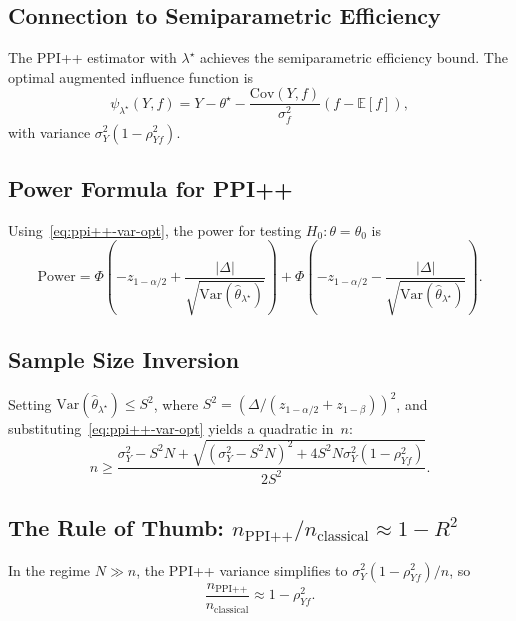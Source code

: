 \documentclass[11pt]{article}
\newcommand{\E}{\mathbb{E}}
\newcommand{\Var}{\mathrm{Var}}
\newcommand{\Cov}{\mathrm{Cov}}
\newcommand{\wh}{\widehat}
\begin{document}
\subsection{Connection to Semiparametric Efficiency}
\label{sec:eif}

The PPI++ estimator with $\lambda^\star$ achieves the semiparametric
efficiency bound.  The optimal augmented influence function is
\[
\psi_{\lambda^\star}(Y,f) = Y - \theta^\star -
  \frac{\Cov(Y,f)}{\sigma_f^2}(f - \E[f]),
\]
with variance $\sigma_Y^2(1 - \rho_{Yf}^2)$.

\subsection{Power Formula for PPI++}
\label{sec:ppi-power-formula}

Using~\eqref{eq:ppi++-var-opt}, the power for testing
$H_0:\theta=\theta_0$ is
\begin{equation}\label{eq:ppi++-power}
\text{Power} = \Phi\!\left(-z_{1-\alpha/2} +
  \frac{|\Delta|}{\sqrt{\Var(\wh\theta_{\lambda^\star})}}\right) +
  \Phi\!\left(-z_{1-\alpha/2} -
  \frac{|\Delta|}{\sqrt{\Var(\wh\theta_{\lambda^\star})}}\right).
\end{equation}

\subsection{Sample Size Inversion}
\label{sec:n-inversion}

Setting $\Var(\wh\theta_{\lambda^\star}) \le S^2$, where
$S^2 = (\Delta/(z_{1-\alpha/2}+z_{1-\beta}))^2$, and
substituting~\eqref{eq:ppi++-var-opt} yields a quadratic in~$n$:
\begin{equation}\label{eq:ppi++-n-formula}
n \ge \frac{\sigma_Y^2 - S^2 N +
  \sqrt{(\sigma_Y^2 - S^2 N)^2 + 4S^2 N\sigma_Y^2(1 - \rho_{Yf}^2)}}
  {2S^2}.
\end{equation}

\subsection{The Rule of Thumb: $n_{\text{PPI++}}/n_{\text{classical}}
  \approx 1 - R^2$}
\label{sec:rule-of-thumb}

In the regime $N \gg n$, the PPI++ variance simplifies to
$\sigma_Y^2(1-\rho_{Yf}^2)/n$, so
\begin{equation}\label{eq:rule-of-thumb}
\frac{n_{\text{PPI++}}}{n_{\text{classical}}} \approx 1 - \rho_{Yf}^2.
\end{equation}
\end{document}
